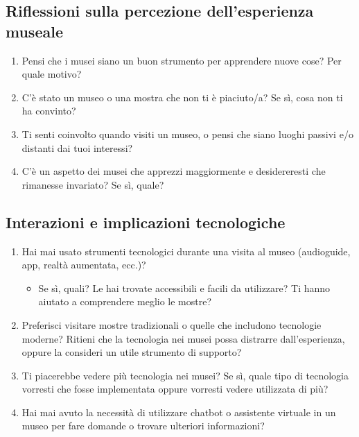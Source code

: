 \documentclass[a4paper, 12pt]{article}
\begin{document}
\subsection{\textcolor{subsectioncolor}{Riflessioni sulla percezione dell'esperienza museale}}
\begin{enumerate}[label=\textcolor{textcolor}{\arabic*.}]
    \item \textcolor{textcolor}{Pensi che i musei siano un buon strumento per apprendere nuove cose? Per quale motivo?}
    \item \textcolor{textcolor}{C’è stato un museo o una mostra che non ti è piaciuto/a? Se sì, cosa non ti ha convinto?}
    \item \textcolor{textcolor}{Ti senti coinvolto quando visiti un museo, o pensi che siano luoghi passivi e/o distanti dai tuoi interessi?}
    \item \textcolor{textcolor}{C’è un aspetto dei musei che apprezzi maggiormente e desidereresti che rimanesse invariato? Se sì, quale?}
\end{enumerate}

\subsection{\textcolor{subsectioncolor}{Interazioni e implicazioni tecnologiche}}
\begin{enumerate}[label=\textcolor{textcolor}{\arabic*.}]
    \item \textcolor{textcolor}{Hai mai usato strumenti tecnologici durante una visita al museo (audioguide, app, realtà aumentata, ecc.)?}
    \begin{itemize}
        \item \textcolor{textcolor}{Se sì, quali? Le hai trovate accessibili e facili da utilizzare? Ti hanno aiutato a comprendere meglio le mostre?}
    \end{itemize}
    \item \textcolor{textcolor}{Preferisci visitare mostre tradizionali o quelle che includono tecnologie moderne? Ritieni che la tecnologia nei musei possa distrarre dall'esperienza, oppure la consideri un utile strumento di supporto?}
    \item \textcolor{textcolor}{Ti piacerebbe vedere più tecnologia nei musei? Se sì, quale tipo di tecnologia vorresti che fosse implementata oppure vorresti vedere utilizzata di più?}
    \item \textcolor{textcolor}{Hai mai avuto la necessità di utilizzare chatbot o assistente virtuale in un museo per fare domande o trovare ulteriori informazioni?}
\end{enumerate}
\end{document}
